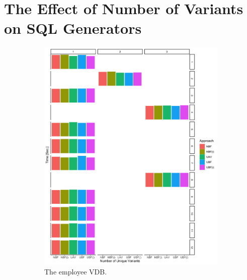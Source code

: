 \section{The Effect of Number of Variants on SQL Generators}
\label{sec:exp-vars}


\begin{figure}
\begin{subfigure}{.4\linewidth}
\centering
\includegraphics[width=\textwidth] {figs/plots/emp-comp-var.png}
\caption[The employee VDB]{The employee VDB.}
\label{fig:emp-var-comp}
\end{subfigure}
\begin{subfigure}{.6\linewidth}
\centering

\end{subfigure}
\end{figure}

